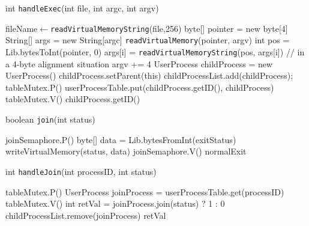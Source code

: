 \documentclass{article}
\newcommand{\eq}{$\leftarrow$}
\begin{document}
\begin{spacing}{1.1}
\begin{algorithm}[htbp]
\label{alg:handleExec}
\caption{int \texttt{handleExec}(int file, int argc, int argv)}
  \begin{algorithmic}[1]
    \STATE fileName\eq\texttt{readVirtualMemoryString}(file,256)
    \ENDIF
    \ENDIF
      \STATE byte[] pointer = new byte[4]
      \STATE String[] args = new String[argc]
        \STATE \texttt{readVirtualMemory}(pointer, argv)
        \STATE int pos = Lib.bytesToInt(pointer, 0)
        \STATE args[i] = \texttt{readVirtualMemoryString}(pos, args[i])
        \STATE \colorbox{myyellow}{// in a 4-byte alignment situation}
        \STATE argv += 4
        \ENDFOR
    \STATE UserProcess childProcess = new UserProcess()
    \ENDIF
    \STATE childProcess.setParent(this)
    \STATE childProcessList.add(childProcess);
    \STATE \colorbox{myyellow}{tableMutex.P()}
    \STATE userProcessTable.put(childProcess.getID(), childProcess)
    \STATE \colorbox{myyellow}{tableMutex.V()}
    \ENDIF
    \RETURN childProcess.getID()
  \end{algorithmic}
\end{algorithm}

\begin{algorithm}[htbp]
\label{alg:join}
\caption{boolean \texttt{join}(int status)}
  \begin{algorithmic}
    \STATE joinSemaphore.P()
    \STATE byte[] data = Lib.bytesFromInt(exitStatus)
    \STATE writeVirtualMemory(status, data)
    \STATE joinSemaphore.V()
    \RETURN normalExit
  \end{algorithmic}
\end{algorithm}

\begin{algorithm}[htbp]
\label{alg:handleJoin}
\caption{int \texttt{handleJoin}(int processID, int status)}
  \begin{algorithmic}
    \STATE \colorbox{myyellow}{tableMutex.P()}
    \STATE UserProcess joinProcess = userProcessTable.get(processID)
    \STATE \colorbox{myyellow}{tableMutex.V()}
    \ENDIF
    \STATE int retVal = joinProcess.join(status) ? 1 : 0
    \STATE childProcessList.remove(joinProcess)
    \RETURN retVal
  \end{algorithmic}
\end{algorithm}


\end{spacing}
\end{document}
